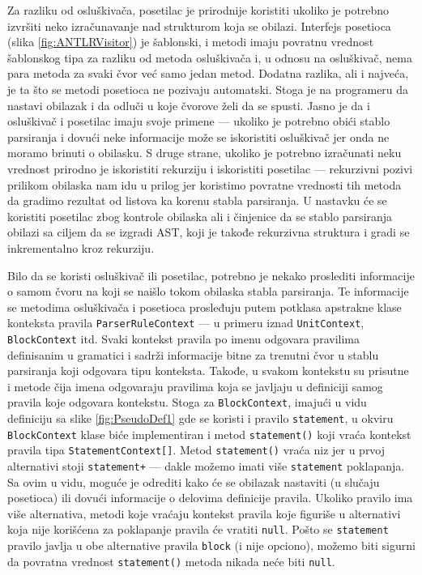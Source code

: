Za razliku od osluškivača, posetilac je prirodnije koristiti ukoliko je potrebno izvršiti neko izračunavanje nad strukturom koja se obilazi. Interfejs posetioca (slika \ref{fig:ANTLRVisitor}) je šablonski, i metodi imaju povratnu vrednost šablonskog tipa za razliku od metoda osluškivača i, u odnosu na osluškivač, nema para metoda za svaki čvor već samo jedan metod. Dodatna razlika, ali i najveća, je ta što se metodi posetioca ne pozivaju automatski. Stoga je na programeru da nastavi obilazak i da odluči u koje čvorove želi da se spusti. Jasno je da i osluškivač i posetilac imaju svoje primene --- ukoliko je potrebno obići stablo parsiranja i dovući neke informacije može se iskoristiti osluškivač jer onda ne moramo brinuti o obilasku. S druge strane, ukoliko je potrebno izračunati neku vrednost prirodno je iskoristiti rekurziju i iskoristiti posetilac --- rekurzivni pozivi prilikom obilaska nam idu u prilog jer koristimo povratne vrednosti tih metoda da gradimo rezultat od listova ka korenu stabla parsiranja. U nastavku će se koristiti posetilac zbog kontrole obilaska ali i činjenice da se stablo parsiranja obilazi sa ciljem da se izgradi AST, koji je takođe rekurzivna struktura i gradi se inkrementalno kroz rekurziju.

Bilo da se koristi osluškivač ili posetilac, potrebno je nekako proslediti informacije o samom čvoru na koji se naišlo tokom obilaska stabla parsiranja. Te informacije se metodima osluškivača i posetioca prosleđuju putem potklasa apstrakne klase konteksta pravila \texttt{ParserRuleContext} --- u primeru iznad \texttt{UnitContext}, \texttt{BlockContext} itd. Svaki kontekst pravila po imenu odgovara pravilima definisanim u gramatici i sadrži informacije bitne za trenutni čvor u stablu parsiranja koji odgovara tipu konteksta. Takođe, u svakom kontekstu su prisutne i metode čija imena odgovaraju pravilima koja se javljaju u definiciji samog pravila koje odgovara kontekstu. Stoga za \texttt{BlockContext}, imajući u vidu definiciju sa slike \ref{fig:PseudoDef1} gde se koristi i pravilo \texttt{statement}, u okviru \texttt{BlockContext} klase biće implementiran i metod \texttt{statement()} koji vraća kontekst pravila tipa \texttt{StatementContext[]}. Metod \texttt{statement()} vraća niz jer u prvoj alternativi stoji \texttt{statement+} --- dakle možemo imati više \texttt{statement} poklapanja. Sa ovim u vidu, moguće je odrediti kako će se obilazak nastaviti (u slučaju posetioca) ili dovući informacije o delovima definicije pravila. Ukoliko pravilo ima više alternativa, metodi koje vraćaju kontekst pravila koje figuriše u alternativi koja nije korišćena za poklapanje pravila će vratiti \texttt{null}. Pošto se \texttt{statement} pravilo javlja u obe alternative pravila \texttt{block} (i nije opciono), možemo biti sigurni da povratna vrednost \texttt{statement()} metoda nikada neće biti \texttt{null}.
